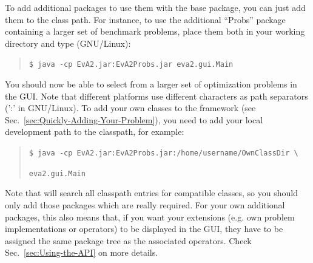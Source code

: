 To add additional packages to use them with the  base package,
you can just add them to the class path. For instance, to use the
additional ``Probs'' package containing a larger set of benchmark
problems, place them both in your working directory and type (GNU/Linux):
\begin{quotation}
\texttt{\small \$ java -cp EvA2.jar:EvA2Probs.jar eva2.gui.Main}{\small \par}
\end{quotation}
You should now be able to select from a larger set of optimization
problems in the GUI. Note that different platforms use different characters
as path separators (':' in GNU/Linux). To add your own classes to
the  framework (see Sec.~\ref{sec:Quickly-Adding-Your-Problem}),
you need to add your local development path to the classpath, for
example:
\begin{quotation}
\texttt{\small \$ java -cp EvA2.jar:EvA2Probs.jar:/home/username/OwnClassDir
\textbackslash{}}{\small \par}

\texttt{\small eva2.gui.Main}{\small \par}
\end{quotation}
Note that  will search all classpath entries for compatible
classes, so you should only add those packages which are really required.
For your own additional packages, this also means that, if you want
your extensions (e.g. own problem implementations or operators) to
be displayed in the  GUI, they have to be assigned the
same package tree as the associated  operators. Check Sec.~\ref{sec:Using-the-API}
on more details.

